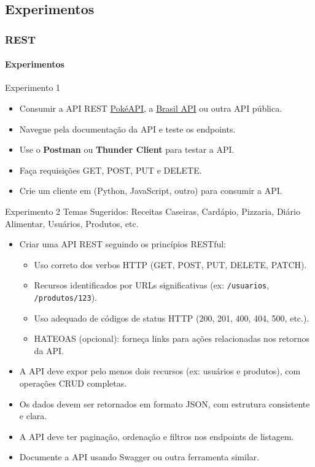 \documentclass[
	9pt, %
	t, %
]{beamer}
\begin{document}
\subsection{Experimentos}

\begin{frame}
	\frametitle{REST}
	\framesubtitle{Experimentos}
	{\small
		\begin{block}{Experimento 1}
			\begin{itemize}
				\item Consumir a API REST \href{https://pokeapi.co/}{PokéAPI}, a
				      \href{https://brasilapi.com.br/docs}{Brasil API} ou outra API pública.
				\item Navegue pela documentação da API e teste os endpoints.
				\item Use o \textbf{Postman} ou \textbf{Thunder Client} para testar a API.
				\item Faça requisições GET, POST, PUT e DELETE.
				\item Crie um cliente em (Python, JavaScript, outro) para consumir a API.
			\end{itemize}
		\end{block}

		\begin{block}{Experimento 2}
			Temas Sugeridos: Receitas Caseiras, Cardápio, Pizzaria, Diário Alimentar, Usuários, Produtos, etc.

			\begin{itemize}
				\item Criar uma API REST seguindo os princípios RESTful:
				\begin{itemize}
					\item Uso correto dos verbos HTTP (GET, POST, PUT, DELETE, PATCH).
					\item Recursos identificados por URLs significativas (ex: \texttt{/usuarios}, \texttt{/produtos/123}).
					\item Uso adequado de códigos de status HTTP (200, 201, 400, 404, 500, etc.).
					\item HATEOAS (opcional): forneça links para ações relacionadas nos retornos da API.
				\end{itemize}
				\item A API deve expor pelo menos dois recursos (ex: usuários e produtos), com operações CRUD completas.
				\item Os dados devem ser retornados em formato JSON, com estrutura consistente e clara.
				\item A API deve ter paginação, ordenação e filtros nos endpoints de listagem.
				\item Documente a API usando Swagger ou outra ferramenta similar.
			\end{itemize}
		\end{block}
		
	}

\end{frame}
\end{document}
